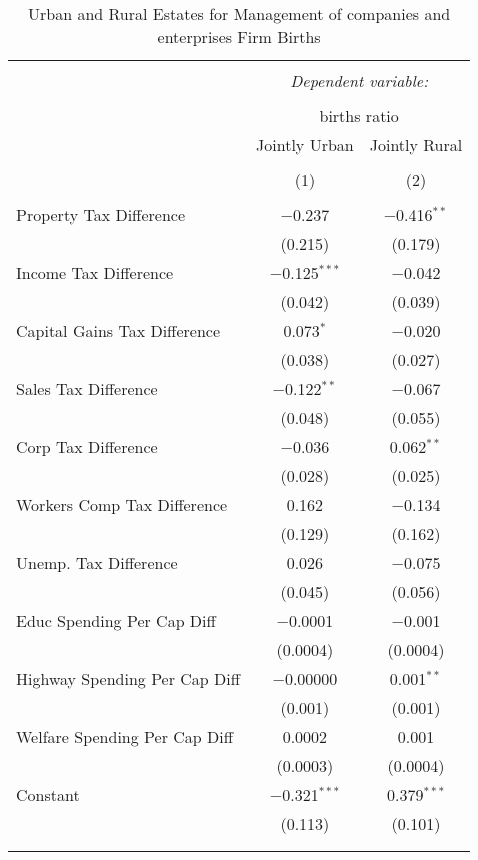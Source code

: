 
\begin{table}[!htbp] \centering 
  \caption{Urban and Rural Estates for  Management of companies and enterprises Firm Births} 
  \label{} 
\begin{tabular}{@{\extracolsep{5pt}}lcc} 
\\[-1.8ex]\hline 
\hline \\[-1.8ex] 
 & \multicolumn{2}{c}{\textit{Dependent variable:}} \\ 
\cline{2-3} 
\\[-1.8ex] & \multicolumn{2}{c}{births ratio} \\ 
 & Jointly Urban & Jointly Rural \\ 
\\[-1.8ex] & (1) & (2)\\ 
\hline \\[-1.8ex] 
 Property Tax Difference & $-$0.237 & $-$0.416$^{**}$ \\ 
  & (0.215) & (0.179) \\ 
  Income Tax Difference & $-$0.125$^{***}$ & $-$0.042 \\ 
  & (0.042) & (0.039) \\ 
  Capital Gains Tax Difference & 0.073$^{*}$ & $-$0.020 \\ 
  & (0.038) & (0.027) \\ 
  Sales Tax Difference & $-$0.122$^{**}$ & $-$0.067 \\ 
  & (0.048) & (0.055) \\ 
  Corp Tax Difference & $-$0.036 & 0.062$^{**}$ \\ 
  & (0.028) & (0.025) \\ 
  Workers Comp Tax Difference & 0.162 & $-$0.134 \\ 
  & (0.129) & (0.162) \\ 
  Unemp. Tax Difference & 0.026 & $-$0.075 \\ 
  & (0.045) & (0.056) \\ 
  Educ Spending Per Cap Diff & $-$0.0001 & $-$0.001 \\ 
  & (0.0004) & (0.0004) \\ 
  Highway Spending Per Cap Diff & $-$0.00000 & 0.001$^{**}$ \\ 
  & (0.001) & (0.001) \\ 
  Welfare Spending Per Cap Diff & 0.0002 & 0.001 \\ 
  & (0.0003) & (0.0004) \\ 
  Constant & $-$0.321$^{***}$ & 0.379$^{***}$ \\ 
  & (0.113) & (0.101) \\ 
 \hline \\[-1.8ex] 
\hline 
\hline \\[-1.8ex] 
\end{tabular} 
\end{table} 
